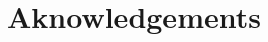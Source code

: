 \documentclass[../master_thesis.tex]{subfiles}
\begin{document}
\chapter{Aknowledgements}


\biblio
\end{document}
